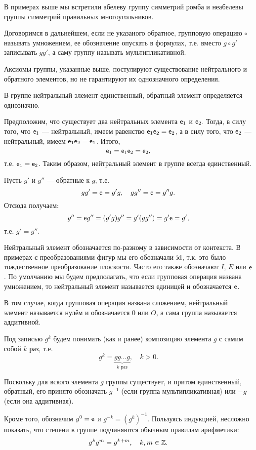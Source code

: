 В примерах выше мы встретили абелеву группу симметрий ромба и неабелевы группы симметрий правильных многоугольников.

Договоримся в дальнейшем, если не указаного обратное, групповую операцию $\circ$ называть умножением, ее обозначение опускать в формулах, т.е. вместо $g\circ g'$ записывать $gg'$, а саму группу называть мультипликативной.

Аксиомы группы, указанные выше, постулируют существование нейтрального и обратного элементов, но не гарантируют их однозначного определения.
\begin{thrm}
В группе нейтральный элемент единственный, обратный элемент определяется однозначно.
\end{thrm}
\pf
Предположим, что существует два нейтральных элемента $\mathsf e_1$ и $\mathsf e_2$. Тогда, в силу того, что $\mathsf e_1$ --- нейтральный, имеем равенство $\mathsf e_1\mathsf e_2=\mathsf e_2$, а в силу того, что $\mathsf e_2$ --- нейтральный, имеем $\mathsf e_1\mathsf e_2=\mathsf e_1$. Итого,
$$
\mathsf e_1 = \mathsf e_1\mathsf e_2 = \mathsf e_2,
$$
т.е. $\mathsf e_1=\mathsf e_2$. Таким образом, нейтральный элемент в группе всегда единственный.

Пусть $g'$ и $g''$ --- обратные к $g$, т.е.
$$
gg'=\mathsf e=g'g,\quad gg''=\mathsf e=g''g.
$$
Отсюда получаем:
$$
g''=\mathsf e g''=(g'g)g''=g'(gg'')=g'\mathsf e=g',
$$
т.е. $g'=g''$.
\epf

Нейтральный элемент обозначается по-разному в зависимости от контекста. В примерах с преобразованиями фигур мы его обозначали $\mathrm{id}$, т.к. это было тождественное преобразование плоскости. Часто его также обозначают $I$, $E$ или $\mathsf e$. По умолчанию мы будем предполагать, что если групповая операция названа умножением, то нейтральный элемент называется единицей и обозначается $\mathsf e$.

В том случае, когда групповая операция названа сложением, нейтральный элемент называется нулём и обозначается 0 или $O$, а сама группа называется аддитивной.

Под записью $g^k$ будем понимать (как и ранее) композицию элемента $g$ с самим собой $k$ раз, т.е.
$$
g^k = \underbrace{gg\dots g}_{k\mbox{ раз}},\quad k>0.
$$

Поскольку для вского элемента $g$ группы существует, и притом единственный, обратный, его принято обозначать $g^{-1}$ (если группа мультипликативная) или $-g$ (если она аддитивная).

Кроме того, обозначим $g^0=\mathsf e$ и $g^{-k}=(g^k)^{-1}$. Пользуясь индукцией, несложно показать, что степени в группе подчиняются обычным правилам арифметики:
$$
g^kg^m=g^{k+m}, \quad k,m\in\mathbb Z.
$$


